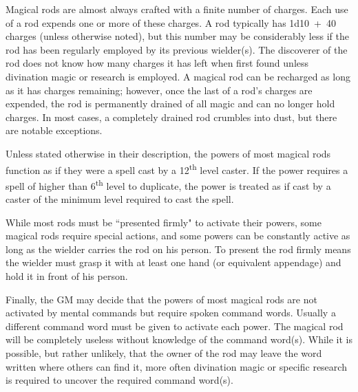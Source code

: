 \begin{multicols}{2}
Magical rods are almost always crafted with a finite number of charges.  Each use of a rod expends one or more of these charges.  A rod typically has 1d10~+~40 charges (unless otherwise noted), but this number may be considerably less if the rod has been regularly employed by its previous wielder(s).  The discoverer of the rod does not know how many charges it has left when first found unless divination magic or research is employed.  A magical rod can be recharged as long as it has charges remaining; however, once the last of a rod's charges are expended, the rod is permanently drained of all magic and can no longer hold charges.  In most cases, a completely drained rod crumbles into dust, but there are notable exceptions.

Unless stated otherwise in their description, the powers of most magical rods function as if they were a spell cast by a 12\textsuperscript{th} level caster.  If the power requires a spell of higher than 6\textsuperscript{th} level to duplicate, the power is treated as if cast by a caster of the minimum level required to cast the spell.  

While most rods must be ``presented firmly" to activate their powers, some magical rods require special actions, and some powers can be constantly active as long as the wielder carries the rod on his person.  To present the rod firmly means the wielder must grasp it with at least one hand (or equivalent appendage) and hold it in front of his person.  

Finally, the GM may decide that the powers of most magical rods are not activated by mental commands but require spoken command words.  Usually a different command word must be given to activate each power.  The magical rod will be completely useless without knowledge of the command word(s).  While it is possible, but rather unlikely, that the owner of the rod may leave the word written where others can find it, more often divination magic or specific research is required to uncover the required command word(s).

\noindent
\begin{minipage}{\columnwidth}


\end{minipage}
\end{multicols}
